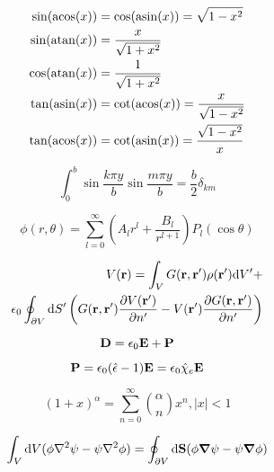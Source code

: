 \documentclass[11pt,twoside]{article}
\begin{document}
\begin{multicols}{3}
\begin{equation}
\begin{split}
\sin(\acos(x)) &= \cos(\asin(x))= \sqrt{1-x^2} \\
\sin(\atan(x)) &= \frac{x}{\sqrt{1+x^2}} \\
\cos(\atan(x)) &= \frac{1}{\sqrt{1+x^2}} \\
\tan(\asin(x)) &= \cot(\acos(x))= \frac{x}{\sqrt{1-x^2}} \\
\tan(\acos(x)) &= \cot(\asin(x)) = \frac{\sqrt{1-x^2}}{x}
\end{split}
\end{equation}

\begin{equation}
\int_0^b \sin\frac{k \pi y}{b}\sin \frac{m \pi y}{b} = \frac{b}{2} \delta_{km}
\end{equation}

\begin{equation}
\phi(r,\theta) = \sum_{l=0}^{\infty} \left (A_l r^l + \frac{B_l}{r^{l+1}} \right)P_l(\cos\theta)
\end{equation}

\begin{equation}
\begin{split}
V(\vb{r})=\int_V G(\vb{r},\vb{r'})\rho(\vb{r'})\dd V' + \\ \epsilon_0 \oint_{\partial V} \dd S' \left (G(\vb{r},\vb{r'})\pdv{V(\vb{r'})}{n'} - V(\vb{r'})\pdv{G(\vb{r},\vb{r'})}{n'} \right )
\end{split}
\end{equation}

\begin{equation}
\vb{D} = \epsilon_0\vb{E} + \vb{P}
\end{equation}

\begin{equation}
\vb{P} = \epsilon_0 (\hat{\epsilon} -1)\vb{E} = \epsilon_0 \hat{\chi}_e \vb{E}
\end{equation}

\begin{equation}
(1+x)^\alpha = \sum_{n=0}^{\infty} \binom{\alpha}{n}x^n, |x|<1
\end{equation}

\begin{equation}
\begin{split}
\int_V \dd V (\phi \laplacian \psi - \psi \laplacian \phi) = \oint_{\partial V} \dd \vb{S}(\phi \grad \psi - \psi \grad \phi)
\end{split}
\end{equation}


\end{multicols}
\end{document}
